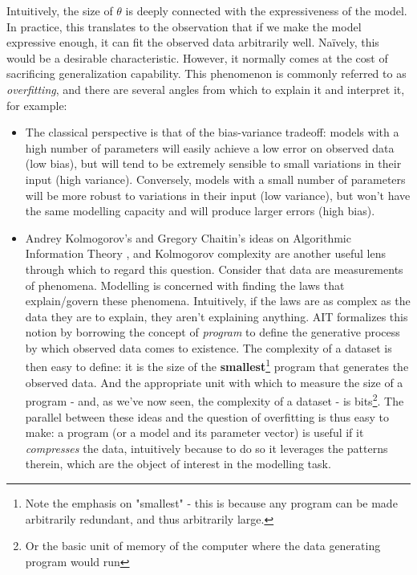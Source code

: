 Intuitively, the size of $\theta$ is deeply connected with the expressiveness
of the model. In practice, this translates to the observation that if we make
the model expressive enough, it can fit the observed data arbitrarily well. Naïvely,
this would be a desirable characteristic. However, it normally comes at the cost
of sacrificing generalization capability. This phenomenon is commonly referred
to as \emph{overfitting}, and there are several angles from which to explain it
and interpret it, for example:
\begin{itemize}
    \item The classical perspective is that of the bias-variance tradeoff:
        models with a high number of parameters will easily achieve a low
        error on observed data (low bias), but will tend to be extremely
        sensible to small variations in their input (high variance). Conversely,
        models with a small number of parameters will be more robust to
        variations in their input (low variance), but won't have the same
        modelling capacity and will produce larger errors (high bias).
    \item Andrey Kolmogorov's and Gregory Chaitin's ideas on Algorithmic Information
        Theory \cite{chaitin-leibniz}, and Kolmogorov complexity  are another
        useful lens through which to regard this question. Consider that data are
        measurements of phenomena. Modelling is concerned with finding the
        laws that explain/govern these phenomena. Intuitively, if the laws are
        as complex as the data they are to explain, they aren't explaining anything.
        AIT formalizes this notion by borrowing the concept of \emph{program} to
        define the generative process by which observed data comes to existence.
        The complexity of a dataset is then easy to define: it is the size of
        the \textbf{smallest}\footnote{Note the emphasis on "smallest" - this is
        because any program can be made arbitrarily redundant, and thus arbitrarily large.}
        program that generates the observed data. And the appropriate unit with
        which to measure the size of a program - and, as we've now seen, the
        complexity of a dataset - is bits\footnote{Or the basic unit of memory
        of the computer where the data generating program would run}. The parallel
        between these ideas and the question of overfitting is thus easy to make:
        a program (or a model and its parameter vector)  is useful if it 
        \emph{compresses} the data, intuitively because to do so it leverages the
        patterns therein, which are the object of interest in the modelling task.
\end{itemize}

